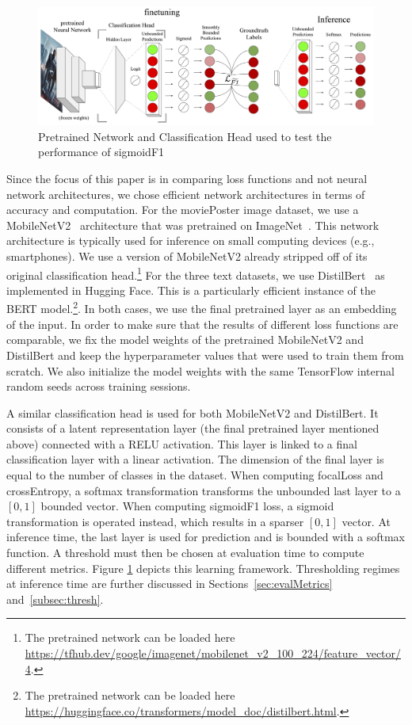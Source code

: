 \begin{figure}[htbp]
\centering
\includegraphics[width=.9\linewidth]{./images/architecture.png}
\caption{\label{fig:architecture}
Pretrained Network and Classification Head used to test the performance of sigmoidF1}
\end{figure}

Since the focus of this paper is in comparing loss functions and not neural network architectures, we chose efficient network architectures in terms of accuracy and computation.
For the moviePoster image dataset, we use a MobileNetV2~\cite{mobileNet} architecture that was pretrained on ImageNet~\cite{imagenet}. This network architecture is typically used for inference on small computing devices (e.g., smartphones). We use a version of MobileNetV2 already stripped off of its original classification head.\footnote{The pretrained network can be loaded here \url{https://tfhub.dev/google/imagenet/mobilenet_v2_100_224/feature_vector/4}.}
For the three text datasets, we use DistilBert~\cite{distilBert} as implemented in Hugging Face. This is a particularly efficient instance of the BERT model.\footnote{The pretrained network can be loaded here \url{https://huggingface.co/transformers/model_doc/distilbert.html}.}.
In both cases, we use the final pretrained layer as an embedding of the input. In order to make sure that the results of different loss functions are comparable, we fix the model weights of the pretrained MobileNetV2 and DistilBert and keep the hyperparameter values that were used to train them from scratch. We also initialize the model weights with the same TensorFlow internal random seeds across training sessions.

A similar classification head is used for both MobileNetV2 and DistilBert. It consists of a latent representation layer (the final pretrained layer mentioned above) connected with a RELU activation. This layer is linked to a final classification layer with a linear activation. The dimension of the final layer is equal to the number of classes in the dataset. When computing focalLoss and crossEntropy, a softmax transformation transforms the unbounded last layer to a $[0,1]$ bounded vector. When computing sigmoidF1 loss, a sigmoid transformation is operated instead, which results in a sparser $[0,1]$ vector. At inference time, the last layer is used for prediction and is bounded with a softmax function. A threshold must then be chosen at evaluation time to compute different metrics. Figure \ref{fig:architecture} depicts this learning framework. Thresholding regimes at inference time are further discussed in Sections~\ref{sec:evalMetrics} and~\ref{subsec:thresh}.

